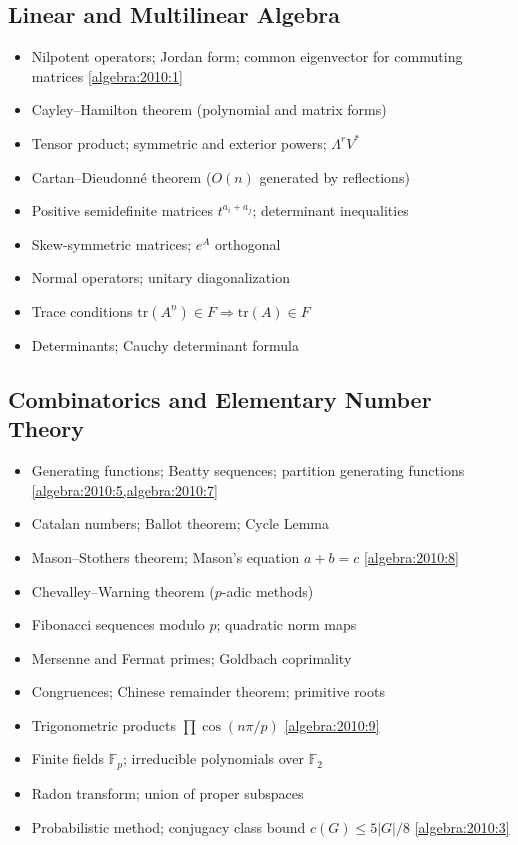 \subsection{Linear and Multilinear Algebra}

\begin{itemize}
  \item Nilpotent operators; Jordan form; common eigenvector for commuting matrices \hfill \cref{algebra:2010:1}
  \item Cayley--Hamilton theorem (polynomial and matrix forms)
  \item Tensor product; symmetric and exterior powers; $\Lambda^r V^*$
  \item Cartan--Dieudonn\'e theorem ($O(n)$ generated by reflections)
  \item Positive semidefinite matrices $t^{a_i+a_j}$; determinant inequalities
  \item Skew-symmetric matrices; $e^A$ orthogonal
  \item Normal operators; unitary diagonalization
  \item Trace conditions $\mathrm{tr}(A^n)\in F\Rightarrow\mathrm{tr}(A)\in F$
  \item Determinants; Cauchy determinant formula
\end{itemize}

\subsection{Combinatorics and Elementary Number Theory}

\begin{itemize}
  \item Generating functions; Beatty sequences; partition generating functions \hfill \cref{algebra:2010:5,algebra:2010:7}
  \item Catalan numbers; Ballot theorem; Cycle Lemma
  \item Mason--Stothers theorem; Mason's equation $a+b=c$ \hfill \cref{algebra:2010:8}
  \item Chevalley--Warning theorem ($p$-adic methods)
  \item Fibonacci sequences modulo $p$; quadratic norm maps
  \item Mersenne and Fermat primes; Goldbach coprimality
  \item Congruences; Chinese remainder theorem; primitive roots
  \item Trigonometric products $\prod\cos(n\pi/p)$ \hfill \cref{algebra:2010:9}
  \item Finite fields $\mathbb{F}_p$; irreducible polynomials over $\mathbb{F}_2$
  \item Radon transform; union of proper subspaces
  \item Probabilistic method; conjugacy class bound $c(G)\leq 5|G|/8$ \hfill \cref{algebra:2010:3}
\end{itemize}

